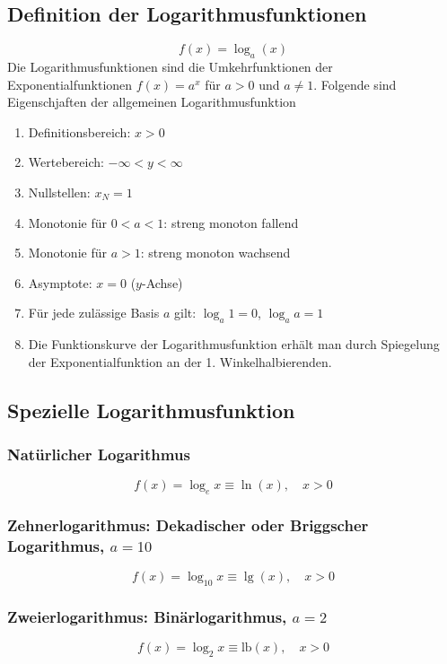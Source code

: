 \subsection{Definition der Logarithmusfunktionen}
\begin{equation}
\boxed{f\left(x\right)=\log_a\left(x\right)}
\end{equation}
Die Logarithmusfunktionen sind die Umkehrfunktionen der Exponentialfunktionen $f\left(x\right)=a^x$ für $a>0$ und $a\neq 1$. Folgende sind Eigenschjaften der allgemeinen Logarithmusfunktion
\begin{enumerate}[$(a)$]
\item Definitionsbereich: $x>0$
\item Wertebereich: $-\infty < y < \infty$
\item Nullstellen: $x_N=1$
\item Monotonie für $0<a<1$: streng monoton fallend 
\item Monotonie für $a>1$: streng monoton wachsend 
\item Asymptote: $x=0$ ($y$-Achse)
\item Für jede zulässige Basis $a$ gilt: $\log_a1=0$, $\log_aa=1$
\item Die Funktionskurve der Logarithmusfunktion erhält man durch Spiegelung der Exponentialfunktion an der 1. Winkelhalbierenden.
\end{enumerate}
\subsection{Spezielle Logarithmusfunktion}
\subsubsection{Natürlicher Logarithmus}
\begin{equation}
\boxed{f\left(x\right)=\log_ex\equiv \ln\left(x\right),\quad x>0}
\end{equation}
\subsubsection{Zehnerlogarithmus: Dekadischer oder Briggscher Logarithmus, $a=10$}
\begin{equation}
\boxed{f\left(x\right)=\log_{10}x\equiv \lg\left(x\right),\quad x>0}
\end{equation}
\subsubsection{Zweierlogarithmus: Binärlogarithmus, $a=2$}
\begin{equation}
\boxed{f\left(x\right)=\log_{2}x\equiv \text{lb}\left(x\right),\quad x>0}
\end{equation}
